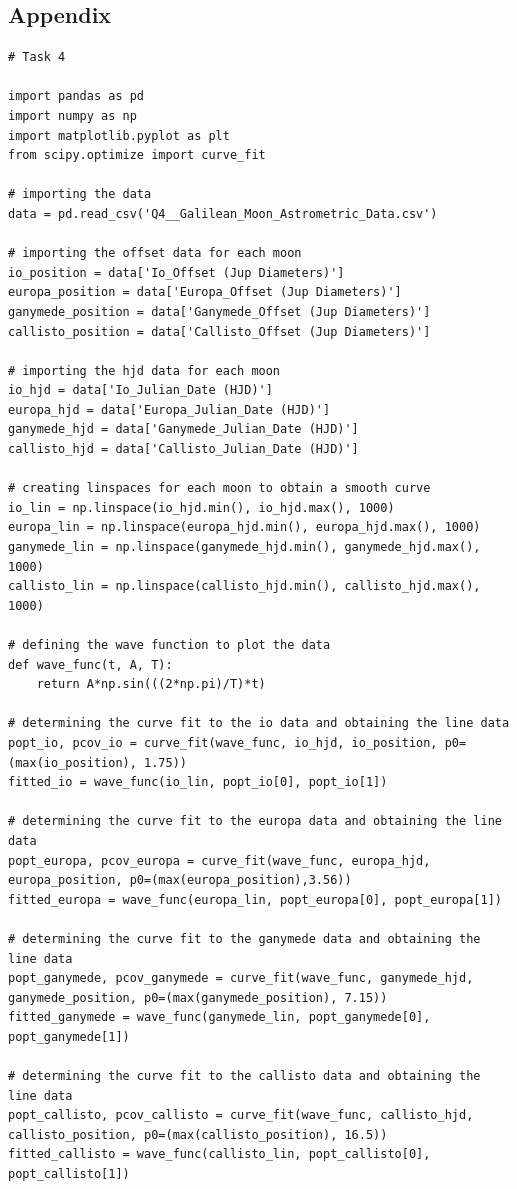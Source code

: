 \documentclass[12pt, a4paper]{article}
\begin{document}
\subsection{Appendix}
\begin{verbatim}
# Task 4

import pandas as pd
import numpy as np
import matplotlib.pyplot as plt
from scipy.optimize import curve_fit

# importing the data 
data = pd.read_csv('Q4__Galilean_Moon_Astrometric_Data.csv')

# importing the offset data for each moon
io_position = data['Io_Offset (Jup Diameters)']
europa_position = data['Europa_Offset (Jup Diameters)']
ganymede_position = data['Ganymede_Offset (Jup Diameters)']
callisto_position = data['Callisto_Offset (Jup Diameters)']

# importing the hjd data for each moon
io_hjd = data['Io_Julian_Date (HJD)']
europa_hjd = data['Europa_Julian_Date (HJD)']
ganymede_hjd = data['Ganymede_Julian_Date (HJD)']
callisto_hjd = data['Callisto_Julian_Date (HJD)']

# creating linspaces for each moon to obtain a smooth curve
io_lin = np.linspace(io_hjd.min(), io_hjd.max(), 1000)
europa_lin = np.linspace(europa_hjd.min(), europa_hjd.max(), 1000)
ganymede_lin = np.linspace(ganymede_hjd.min(), ganymede_hjd.max(), 1000)
callisto_lin = np.linspace(callisto_hjd.min(), callisto_hjd.max(), 1000)

# defining the wave function to plot the data
def wave_func(t, A, T):
    return A*np.sin(((2*np.pi)/T)*t)

# determining the curve fit to the io data and obtaining the line data
popt_io, pcov_io = curve_fit(wave_func, io_hjd, io_position, p0=(max(io_position), 1.75))
fitted_io = wave_func(io_lin, popt_io[0], popt_io[1])

# determining the curve fit to the europa data and obtaining the line data
popt_europa, pcov_europa = curve_fit(wave_func, europa_hjd, europa_position, p0=(max(europa_position),3.56))
fitted_europa = wave_func(europa_lin, popt_europa[0], popt_europa[1])

# determining the curve fit to the ganymede data and obtaining the line data
popt_ganymede, pcov_ganymede = curve_fit(wave_func, ganymede_hjd, ganymede_position, p0=(max(ganymede_position), 7.15))
fitted_ganymede = wave_func(ganymede_lin, popt_ganymede[0], popt_ganymede[1])

# determining the curve fit to the callisto data and obtaining the line data
popt_callisto, pcov_callisto = curve_fit(wave_func, callisto_hjd, callisto_position, p0=(max(callisto_position), 16.5))
fitted_callisto = wave_func(callisto_lin, popt_callisto[0], popt_callisto[1])


\end{verbatim}
\end{document}
